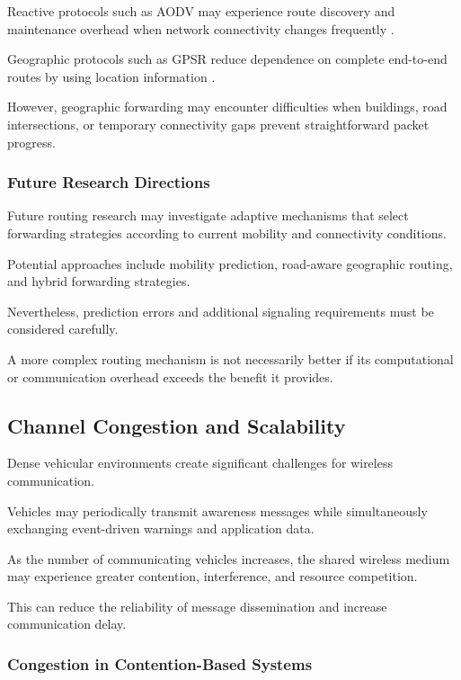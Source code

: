 Reactive protocols such as AODV may experience
route discovery and maintenance overhead when
network connectivity changes frequently
\cite{Perkins1999}.

Geographic protocols such as GPSR reduce
dependence on complete end-to-end routes
by using location information
\cite{Karp2000}.

However, geographic forwarding may encounter
difficulties when buildings, road intersections,
or temporary connectivity gaps prevent
straightforward packet progress.

\subsubsection{Future Research Directions}

Future routing research may investigate
adaptive mechanisms that select forwarding
strategies according to current mobility
and connectivity conditions.

Potential approaches include mobility
prediction, road-aware geographic routing,
and hybrid forwarding strategies.

Nevertheless, prediction errors and
additional signaling requirements must
be considered carefully.

A more complex routing mechanism is not
necessarily better if its computational
or communication overhead exceeds
the benefit it provides.

\subsection{Channel Congestion and Scalability}

Dense vehicular environments create
significant challenges for wireless
communication.

Vehicles may periodically transmit
awareness messages while simultaneously
exchanging event-driven warnings
and application data.

As the number of communicating vehicles
increases, the shared wireless medium
may experience greater contention,
interference, and resource competition.

This can reduce the reliability of
message dissemination and increase
communication delay.

\subsubsection{Congestion in Contention-Based Systems}

